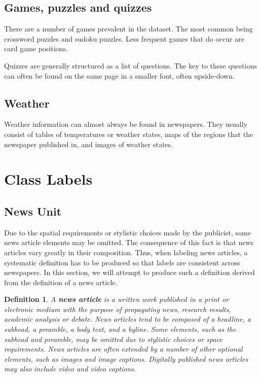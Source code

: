 \documentclass[english, bibtex]{kththesis}
\begin{document}
\subsection{Games, puzzles and quizzes}

There are a number of games prevalent in the dataset. The most common being crossword puzzles and sudoku puzzles. Less frequent games that do occur are card game positions.

Quizzes are generally structured as a list of questions. The key to these questions can often be found on the same page in a smaller font, often upside-down.

\subsection{Weather}

Weather information can almost always be found in newspapers. They usually consist of tables of temperatures or weather states, maps of the regions that the newspaper published in, and images of weather states. 


\section{Class Labels}

\subsection{News Unit}

Due to the spatial requirements or stylistic choices made by the publicist, some news article elements may be omitted. The consequence of this fact is that news articles vary greatly in their composition. Thus, when labeling news articles, a systematic definition has to be produced so that labels are consistent across newspapers. In this section, we will attempt to produce such a definition derived from the definition of a news article.

\newtheorem{thm}{Theorem}
\newtheorem{defn}[thm]{Definition}
\begin{defn}
\label{newsarticle}
A \textbf{news article} is a written work published in a print or electronic medium with the purpose of propagating news, research results, academic analysis or debate. News articles tend to be composed of a headline, a subhead, a preamble, a body text, and a byline. Some elements, such as the subhead and preamble, may be omitted due to stylistic choices or space requirements. News articles are often extended by a number of other optional elements, such as images and image captions. Digitally published news articles may also include video and video captions.
\end{defn}
\end{document}

